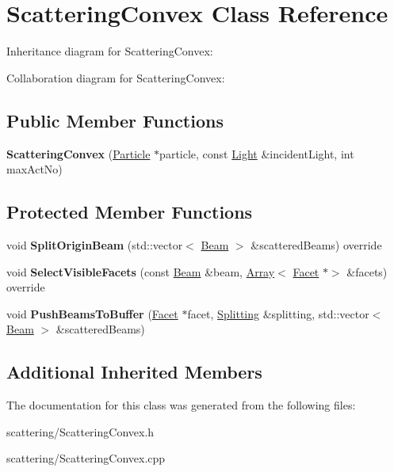 \hypertarget{class_scattering_convex}{}\section{Scattering\+Convex Class Reference}
\label{class_scattering_convex}


Inheritance diagram for Scattering\+Convex\+:


Collaboration diagram for Scattering\+Convex\+:
\subsection*{Public Member Functions}
\begin{DoxyCompactItemize}
\item 
\mbox{\label{class_scattering_convex_a94805a2f8ee65ee820fc09a639e2ba56}} 
{\bfseries Scattering\+Convex} (\mbox{\hyperlink{class_particle}{Particle}} $\ast$particle, const \mbox{\hyperlink{class_light}{Light}} \&incident\+Light, int max\+Act\+No)
\end{DoxyCompactItemize}
\subsection*{Protected Member Functions}
\begin{DoxyCompactItemize}
\item 
\mbox{\label{class_scattering_convex_a0884df61c37195f81996c9cacd13e752}} 
void {\bfseries Split\+Origin\+Beam} (std\+::vector$<$ \mbox{\hyperlink{class_beam}{Beam}} $>$ \&scattered\+Beams) override
\item 
\mbox{\label{class_scattering_convex_abac99b0f9e1bff5ae4bd70e389af1d02}} 
void {\bfseries Select\+Visible\+Facets} (const \mbox{\hyperlink{class_beam}{Beam}} \&beam, \mbox{\hyperlink{class_array}{Array}}$<$ \mbox{\hyperlink{class_facet}{Facet}} $\ast$$>$ \&facets) override
\item 
\mbox{\label{class_scattering_convex_a5714390716541272ef5da8889c77258f}} 
void {\bfseries Push\+Beams\+To\+Buffer} (\mbox{\hyperlink{class_facet}{Facet}} $\ast$facet, \mbox{\hyperlink{class_splitting}{Splitting}} \&splitting, std\+::vector$<$ \mbox{\hyperlink{class_beam}{Beam}} $>$ \&scattered\+Beams)
\end{DoxyCompactItemize}
\subsection*{Additional Inherited Members}


The documentation for this class was generated from the following files\+:\begin{DoxyCompactItemize}
\item 
scattering/Scattering\+Convex.\+h\item 
scattering/Scattering\+Convex.\+cpp\end{DoxyCompactItemize}
